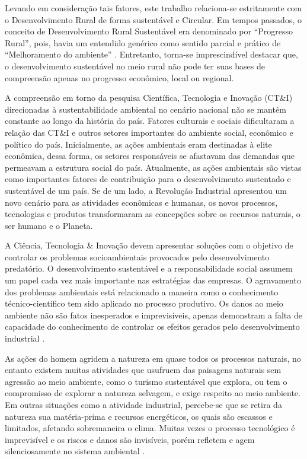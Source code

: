 Levando em consideração tais fatores, este trabalho relaciona-se estritamente com o Desenvolvimento Rural de forma sustentável e Circular. Em tempos passados, o conceito de Desenvolvimento Rural Sustentável era denominado por “Progresso Rural”, pois, havia um entendido genérico como sentido parcial e prático de “Melhoramento do ambiente” \cite{almeida_da_1995}. Entretanto, torna-se imprescindível destacar que, o desenvolvimento sustentável no meio rural não pode ter suas bases de compreensão apenas no progresso econômico, local ou regional.

A compreensão em torno da pesquisa Científica, Tecnologia e Inovação (CT\&I) direcionadas à sustentabilidade ambiental no cenário nacional não se mantém constante ao longo da história do país. Fatores culturais e sociais dificultaram a relação das CT\&I e outros setores importantes do ambiente social, econômico e político do país. Inicialmente, as ações ambientais eram destinadas à elite econômica, dessa forma, os setores responsáveis se afastavam das demandas que permeavam a estrutura social do país. Atualmente, as ações ambientais são vistas como importantes fatores de contribuição para o desenvolvimento sustentado e sustentável de um país. Se de um lado, a Revolução Industrial apresentou um novo cenário para as atividades econômicas e humanas, os novos processos, tecnologias e produtos transformaram as concepções sobre os recursos naturais, o ser humano e o Planeta.

A Ciência, Tecnologia \& Inovação devem apresentar soluções com o objetivo de controlar os problemas socioambientais provocados pelo desenvolvimento predatório. O desenvolvimento sustentável e a responsabilidade social assumem um papel cada vez mais importante nas estratégias das empresas. O agravamento dos problemas ambientais está relacionado a maneira como o conhecimento técnico-científico tem sido aplicado no processo produtivo. Os danos ao meio ambiente não são fatos inesperados e imprevisíveis, apenas demonstram a falta de capacidade do conhecimento de controlar os efeitos gerados pelo desenvolvimento industrial \cite{maranhao_dinamica_2016}.

As ações do homem agridem a natureza em quase todos os processos naturais, no entanto existem muitas atividades que usufruem das paisagens naturais sem agressão ao meio ambiente, como o turismo sustentável que explora, ou tem o compromisso de explorar a natureza selvagem, e exige respeito ao meio ambiente. Em outras situações como a atividade industrial, percebe-se que se retira da natureza sua matéria-prima e recursos energéticos, os quais são escassos e limitados, afetando sobremaneira o clima. Muitas vezes o processo tecnológico é imprevisível e os riscos e danos são invisíveis, porém refletem e agem silenciosamente no sistema ambiental \cite{marques_natureza_2017}.

